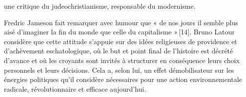         {une critique du judeochristianisme, responsable du modernisme.}
\begin{singlequote}

        Fredric Jameson fait remarquer avec humour que « de nos jours il semble plus aisé d’imaginer la fin du monde que celle du capitalisme » [14]. Bruno Latour considère que cette attitude s’appuie sur des idées religieuses de providence et d’achèvement eschatologique, où le but et point final de l’histoire est décrété d’avance et où les croyants sont invités à structurer en conséquence leurs choix personnels et leurs décisions. Cela a, selon lui, un effet démobilisateur sur les énergies politiques qu’il considère nécessaires pour une action environnementale radicale, révolutionnaire et efficace aujourd’hui.
\end{singlequote}

